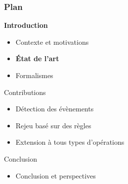 \documentclass[aspectratio=1610]{beamer}
\begin{document}
\begin{frame}
	\frametitle{Plan}
	\centering
	\begin{minipage}{\textwidth}
    \raggedright
  \begin{minipage}{.55\textwidth}
		\begin{mytocblock}{\textbf{Introduction}}
			\begin{itemize}
				\item[] Contexte et motivations
				\item[] \textbf{État de l'art}
				\item[] Formalismes
			\end{itemize}
		\end{mytocblock}
  \end{minipage}

  \vspace{1em}

  \begin{minipage}{.55\textwidth}
    \begin{mytocblock}{Contributions}
			\begin{itemize}
				\item[] Détection des évènements
				\item[] Rejeu basé sur des règles
				\item[] Extension à tous types d'opérations
			\end{itemize}
		\end{mytocblock}
  \end{minipage}

  \vspace{1em}

  \begin{minipage}{.55\textwidth}
    \begin{mytocblock}{Conclusion}
			\begin{itemize}
				\item[] Conclusion et perspectives
			\end{itemize}
		\end{mytocblock}
  \end{minipage}
\end{minipage}
\end{frame}


\end{document}
